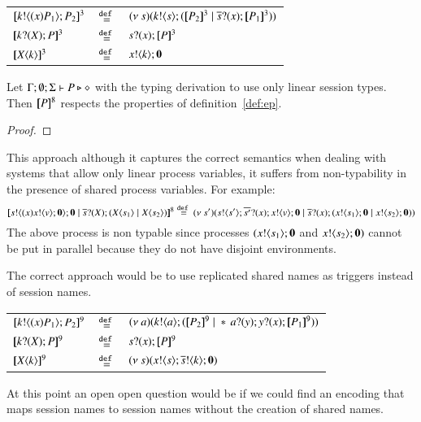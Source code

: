 \begin{definition}

	\begin{tabular}{lcl}
		$[\!\![k ! \langle (x)P_1 \rangle ; P_2]\!\!]^{3}$ &$\stackrel{\mathtt{def}\ }{=}$& $ \newsp{s}{\bout{k}{s} (\map{P_2}^3 \Par \binp{\dual{s}}{x} \map{P_1}^3)} $\\
		$[\!\![k ? (X) ; P]\!\!]^{3}$ &$\stackrel{\mathtt{def}\ }{=}$& $s ? (x) ; [\!\![P]\!\!]^3$\\
		$[\!\![X\langle k \rangle]\!\!]^3$ &$\stackrel{\mathtt{def}\ }{=}$& $x ! \langle k \rangle ; \mathbf{0}$
	\end{tabular}
\end{definition}

\begin{proposition}
	Let $\Gamma;\emptyset;\Sigma \vdash P \triangleright \diamond$ with
	the typing derivation to use only linear session types. Then
	$[\!\![P]\!\!]^8$ respects the properties of definition~\ref{def:ep}.
\end{proposition}

\begin{proof}
\end{proof}

This approach although it captures the correct semantics when
dealing with systems that allow only linear process variables,
it suffers from non-typability in the presence
of shared process variables. For example:
\[
	[\!\![s ! \langle (x)x ! \langle v \rangle ;\mathbf{0} \rangle ; \mathbf{0} \;|\; \overline{s} ? (X) ; (X\langle s_1 \rangle \;|\; X\langle s_2 \rangle)]\!\!]^8 \stackrel{\mathtt{def}\ }{=}
	(\nu\ s')(s ! \langle s' \rangle ; \overline{s'} ? (x) ; x ! \langle v \rangle ; \mathbf{0} \;|\; \overline{s} ? (x) ; (x ! \langle s_1 \rangle ; \mathbf{0} \;|\; x ! \langle s_2 \rangle ; \mathbf{0}))
\]
The above process is non typable since processes $(x ! \langle s_1 \rangle ; \mathbf{0}$ and $x ! \langle s_2 \rangle ; \mathbf{0})$
cannot be put in parallel because they do not have disjoint environments.

The correct approach would be to use replicated shared names
as triggers instead of session names. 

\begin{definition}

	\begin{tabular}{lcl}
		$[\!\![k ! \langle (x)P_1 \rangle ; P_2]\!\!]^{9}$ &$\stackrel{\mathtt{def}\ }{=}$& $ \newsp{a}{\bout{k}{a} (\map{P_2}^9 \Par \repl{} \binp{a}{y} \binp{y}{x} \map{P_1}^9)} $\\
		$[\!\![k ? (X) ; P]\!\!]^{9}$ &$\stackrel{\mathtt{def}\ }{=}$& $s ? (x) ; [\!\![P]\!\!]^9$\\
		$[\!\![X\langle k \rangle]\!\!]^9$ &$\stackrel{\mathtt{def}\ }{=}$& $(\nu\ s)(x ! \langle s \rangle ; \overline{s} ! \langle k \rangle ; \mathbf{0})$
	\end{tabular}
\end{definition}

At this point an open open question would be if
we could find an encoding that maps
session names to session names without the creation
of shared names.



